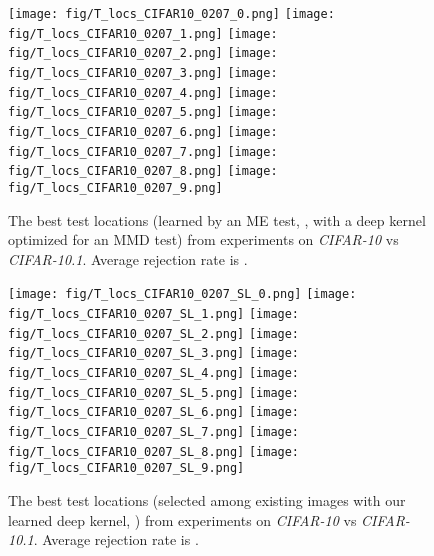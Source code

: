 \documentclass{article}
\begin{document}
\begin{figure}[!p]
    \begin{center}
        \subfigure
        {\texttt{[image: fig/T\_locs\_CIFAR10\_0207\_0.png]}}
        \subfigure
        {\texttt{[image: fig/T\_locs\_CIFAR10\_0207\_1.png]}}
        \subfigure
        {\texttt{[image: fig/T\_locs\_CIFAR10\_0207\_2.png]}}
        \subfigure
        {\texttt{[image: fig/T\_locs\_CIFAR10\_0207\_3.png]}}
        \subfigure
        {\texttt{[image: fig/T\_locs\_CIFAR10\_0207\_4.png]}}
        \subfigure
        {\texttt{[image: fig/T\_locs\_CIFAR10\_0207\_5.png]}}
        \subfigure
        {\texttt{[image: fig/T\_locs\_CIFAR10\_0207\_6.png]}}
        \subfigure
        {\texttt{[image: fig/T\_locs\_CIFAR10\_0207\_7.png]}}
        \subfigure
        {\texttt{[image: fig/T\_locs\_CIFAR10\_0207\_8.png]}}
        \subfigure
        {\texttt{[image: fig/T\_locs\_CIFAR10\_0207\_9.png]}}
        \caption{The best test locations (learned by an ME test, , with a deep kernel optimized for an MMD test) from  experiments on \emph{CIFAR-10} vs \emph{CIFAR-10.1}. Average rejection rate is .}  \label{fig:CIFAR10_interp_learnt}
    \end{center}
    \vspace{-0.5cm}
\end{figure}

\begin{figure}[!p]
    \begin{center}
        \subfigure
        {\texttt{[image: fig/T\_locs\_CIFAR10\_0207\_SL\_0.png]}}
        \subfigure
        {\texttt{[image: fig/T\_locs\_CIFAR10\_0207\_SL\_1.png]}}
        \subfigure
        {\texttt{[image: fig/T\_locs\_CIFAR10\_0207\_SL\_2.png]}}
        \subfigure
        {\texttt{[image: fig/T\_locs\_CIFAR10\_0207\_SL\_3.png]}}
        \subfigure
        {\texttt{[image: fig/T\_locs\_CIFAR10\_0207\_SL\_4.png]}}
        \subfigure
        {\texttt{[image: fig/T\_locs\_CIFAR10\_0207\_SL\_5.png]}}
        \subfigure
        {\texttt{[image: fig/T\_locs\_CIFAR10\_0207\_SL\_6.png]}}
        \subfigure
        {\texttt{[image: fig/T\_locs\_CIFAR10\_0207\_SL\_7.png]}}
        \subfigure
        {\texttt{[image: fig/T\_locs\_CIFAR10\_0207\_SL\_8.png]}}
        \subfigure
        {\texttt{[image: fig/T\_locs\_CIFAR10\_0207\_SL\_9.png]}}
        \caption{The best test locations (selected among existing images with our learned deep kernel, ) from  experiments on \emph{CIFAR-10} vs \emph{CIFAR-10.1}. Average rejection rate is .}  \label{fig:CIFAR10_interp_learnt_SL}
    \end{center}
    \vspace{-0.5cm}
\end{figure}
\end{document}
